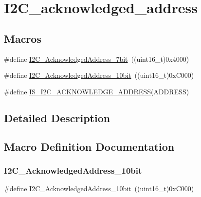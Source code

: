 \hypertarget{group___i2_c__acknowledged__address}{}\section{I2\+C\+\_\+acknowledged\+\_\+address}
\label{group___i2_c__acknowledged__address}
\subsection*{Macros}
\begin{DoxyCompactItemize}
\item 
\#define \mbox{\hyperlink{group___i2_c__acknowledged__address_ga5e5ad2148f9da14457c7b59357acee97}{I2\+C\+\_\+\+Acknowledged\+Address\+\_\+7bit}}~((uint16\+\_\+t)0x4000)
\item 
\#define \mbox{\hyperlink{group___i2_c__acknowledged__address_gaf0bb8f71795f046ad9f6c1fc7fe0fc53}{I2\+C\+\_\+\+Acknowledged\+Address\+\_\+10bit}}~((uint16\+\_\+t)0x\+C000)
\item 
\#define \mbox{\hyperlink{group___i2_c__acknowledged__address_ga26a3af0a468f7226ed72fde27528c0ba}{I\+S\+\_\+\+I2\+C\+\_\+\+A\+C\+K\+N\+O\+W\+L\+E\+D\+G\+E\+\_\+\+A\+D\+D\+R\+E\+SS}}(A\+D\+D\+R\+E\+SS)
\end{DoxyCompactItemize}


\subsection{Detailed Description}


\subsection{Macro Definition Documentation}
\mbox{\label{group___i2_c__acknowledged__address_gaf0bb8f71795f046ad9f6c1fc7fe0fc53}} 
\subsubsection{\texorpdfstring{I2C\_AcknowledgedAddress\_10bit}{I2C\_AcknowledgedAddress\_10bit}}
{\footnotesize\ttfamily \#define I2\+C\+\_\+\+Acknowledged\+Address\+\_\+10bit~((uint16\+\_\+t)0x\+C000)}


